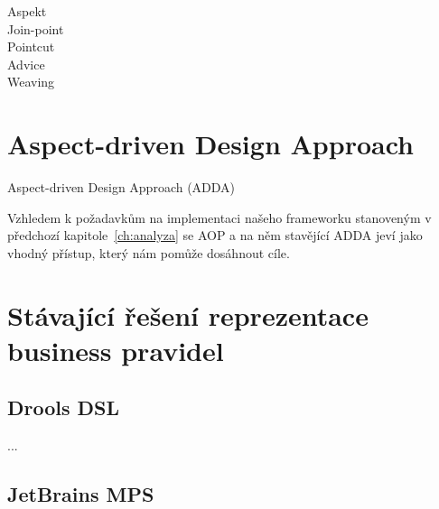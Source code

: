 \begin{description}
    \item [Aspekt]
    \item [Join-point]
    \item [Pointcut]
    \item [Advice]
    \item [Weaving]
\end{description}

\section{Aspect-driven Design Approach}


Aspect-driven Design Approach (ADDA)

Vzhledem k požadavkům na implementaci našeho frameworku stanoveným
v předchozí kapitole~\ref{ch:analyza} se AOP a na něm stavějící ADDA
jeví jako vhodný přístup, který nám pomůže dosáhnout cíle.

\section{Stávající řešení reprezentace business pravidel}

\subsection{Drools DSL}


...

\subsection{JetBrains MPS}

